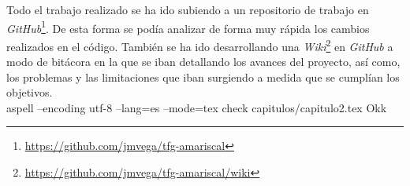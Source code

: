 Todo el trabajo realizado se ha ido subiendo a un repositorio de trabajo en \textit{GitHub}\footnote{\url{https://github.com/jmvega/tfg-amariscal}}. De esta forma se podía analizar de forma muy rápida los cambios realizados en el código. También se ha ido desarrollando una \textit{Wiki}\footnote{\url{https://github.com/jmvega/tfg-amariscal/wiki}} en \textit{GitHub} a modo de bitácora en la que se iban detallando los avances del proyecto, así como, los problemas y las limitaciones que iban surgiendo a medida que se cumplían los objetivos.\\


aspell --encoding utf-8 --lang=es --mode=tex check capitulos/capitulo2.tex Okk
